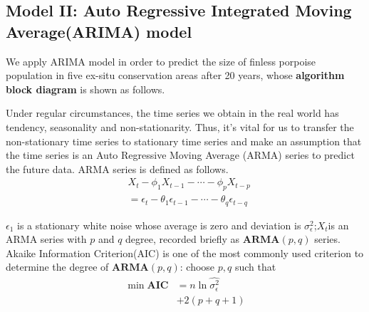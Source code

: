\documentclass{mcmthesis}
\numberwithin{figure}{section}
\numberwithin{table}{section}
\numberwithin{equation}{section}
\begin{document}
\subsection{Model II: Auto Regressive Integrated Moving Average(ARIMA) model}
We apply ARIMA model in order to predict the size of finless porpoise population in five ex-situ 
conservation areas after 20 years, whose \textbf{algorithm block diagram} is shown as follows.
\par
\begin{minipage}[htbp]{0.35\linewidth}
  Under regular circumstances, the time series we obtain in the real world
  has tendency, seasonality and non-stationarity. Thus, it's vital for 
  us to transfer the non-stationary time series to stationary time series and 
  make an assumption that the time series is an Auto Regressive Moving Average
  (ARMA) series to predict the future data.  ARMA series is defined as follows.
  \begin{align*}
    &X_t-\phi_1X_{t-1}-\cdots -\phi_pX_{t-p} \\
    &= \epsilon_t - \theta_1\epsilon_{t-1}-\cdots-\theta_q\epsilon_{t-q}
  \end{align*}
 
$ \epsilon_1 $ is a stationary white noise whose average is zero and
deviation is $ \sigma_\epsilon^2 $;$ X_t $is an ARMA series with $ p $ and $ q $
degree, recorded briefly as $ \mathbf{ARMA}(p,q) $ series.
Akaike Information Criterion(AIC) is one of the most commonly used
criterion to determine the degree of $ \mathbf{ARMA}(p,q) $: choose 
$ p,q $ such that 
\begin{equation}\label{AIC}
  \begin{aligned}
    \min \mathbf{AIC} &= n\ln \hat{\sigma_\epsilon^2} \\
    &+ 2(p+q+1)
  \end{aligned}
\end{equation}

\end{minipage}
\hfill
\end{document}

